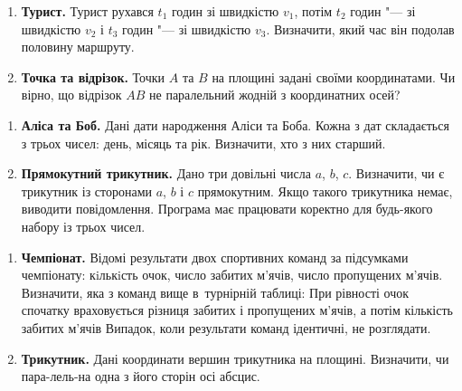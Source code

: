 \documentclass{scrreprt}
\begin{document}
	\newpage
	
	
	{\large
		\begin{enumerate}
			\item \textbf{Турист.} Турист рухався $t_1$ годин зі швидкістю $v_1$, потім $t_2$ годин "--- зі швидкістю $v_2$ і $t_3$ годин "--- зі швидкістю $v_3$. Визначити, який час він подолав половину маршруту.
			\item \textbf{Точка та відрізок.} Точки $A$ та $B$ на площині задані своїми координатами. Чи вірно, що відрізок $AB$ не паралельний жодній з координатних осей?
		\end{enumerate}
	}
	
	\vspace{2cm}
	
	
	{\large
		\begin{enumerate}
			\item \textbf{Аліса та Боб.} Дані дати народження Аліси та Боба. Кожна з дат складається з трьох чисел: день, місяць та рік. Визначити, хто з них старший.
			\item \textbf{Прямокутний трикутник.} Дано три довільні числа $a$, $b$, $c$. Визначити, чи є трикутник із сторонами $a$, $b$ і $c$ прямокутним. Якщо такого трикутника немає, виводити повідомлення. Програма має працювати коректно для будь-якого набору із трьох чисел.
		\end{enumerate}
	}
	
	\newpage
	
	
	{\large
		\begin{enumerate}
			\item \textbf{Чемпіонат.} Відомі результати двох спортивних команд за підсумками чемпіонату: кiль\-кiсть очок, число забитих м'ячів, число пропущених м'ячів. Ви\-зна\-чи\-ти, яка з команд вище в~турнірній таблиці: При рівності очок спочатку враховується різниця забитих і пропущених м'ячів, а потім кількість забитих м'ячів Випадок, коли результати команд ідентичні, не розглядати.
			\item \textbf{Трикутник.} Дані координати вершин трикутника на площині. Визначити, чи пара-лель-на одна з його сторін осі абсцис.
		\end{enumerate}
	}
	
\end{document}
